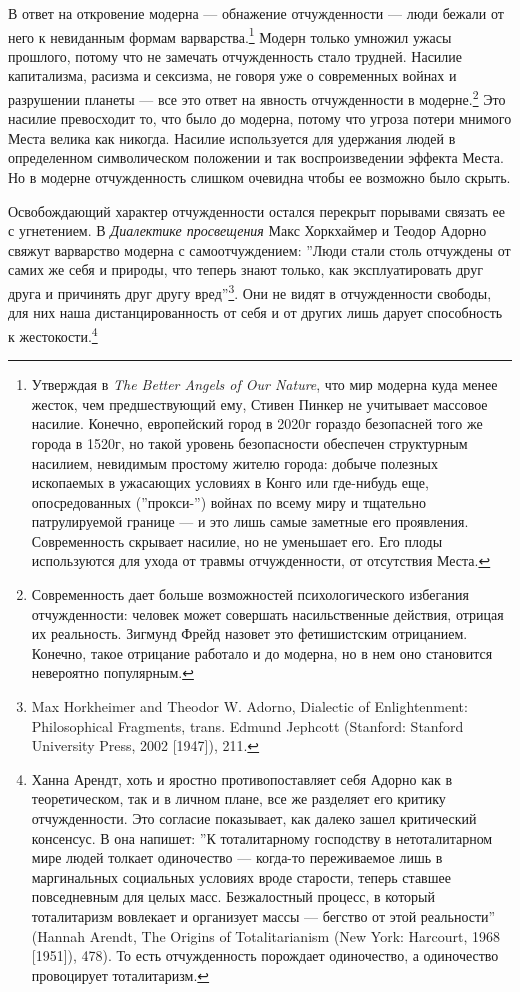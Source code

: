 \documentclass[12pt]{book}
\begin{document}
В ответ на откровение модерна --- обнажение отчужденности --- люди бежали от него к невиданным формам варварства.\footnote{Утверждая в \textit{The Better Angels of Our Nature}, что мир модерна куда менее жесток, чем предшествующий ему, Стивен Пинкер не учитывает массовое насилие. Конечно, европейский город в 2020г гораздо безопасней того же города в 1520г, но такой уровень безопасности обеспечен структурным насилием, невидимым простому жителю города: добыче полезных ископаемых в ужасающих условиях в Конго или где-нибудь еще, опосредованных (''прокси-'') войнах по всему миру и тщательно патрулируемой границе --- и это лишь самые заметные его проявления. Современность скрывает насилие, но не уменьшает его. Его плоды используются для ухода от травмы отчужденности, от отсутствия Места.} Модерн только умножил ужасы прошлого, потому что не замечать отчужденность стало трудней. Насилие капитализма, расизма и сексизма, не говоря уже о современных войнах и разрушении планеты --- все это ответ на явность отчужденности в модерне.\footnote{Современность дает больше возможностей психологического избегания отчужденности: человек может совершать насильственные действия, отрицая их реальность. Зигмунд Фрейд назовет это фетишистским отрицанием. Конечно, такое отрицание работало и до модерна, но в нем оно становится невероятно популярным.} Это насилие превосходит то, что было до модерна, потому что угроза потери мнимого Места велика как никогда. Насилие используется для удержания людей в определенном символическом положении и так воспроизведении эффекта Места. Но в модерне отчужденность слишком очевидна чтобы ее возможно было скрыть.

Освобождающий характер отчужденности остался перекрыт порывами связать ее с угнетением. В \textit{Диалектике просвещения} Макс Хоркхаймер и Теодор Адорно свяжут варварство модерна с самоотчуждением: ''Люди стали столь отчуждены от самих же себя и природы, что теперь знают только, как эксплуатировать друг друга и причинять друг другу вред''\footnote{Max Horkheimer and Theodor W. Adorno, Dialectic of Enlightenment: Philosophical Fragments, trans. Edmund Jephcott (Stanford: Stanford University Press, 2002 [1947]), 211.}. Они не видят в отчужденности свободы, для них наша дистанцированность от себя и от других лишь дарует способность к жестокости.\footnote{Ханна Арендт, хоть и яростно противопоставляет себя Адорно как в теоретическом, так и в личном плане, все же разделяет его критику отчужденности. Это согласие показывает, как далеко зашел критический консенсус. В  она напишет: ''К тоталитарному господству в нетоталитарном мире людей толкает одиночество --- когда-то переживаемое лишь в маргинальных социальных условиях вроде старости, теперь ставшее повседневным для целых масс. Безжалостный процесс, в который тоталитаризм вовлекает и организует массы --- бегство от этой реальности'' (Hannah Arendt, The Origins of Totalitarianism (New York: Harcourt, 1968 [1951]), 478). То есть отчужденность порождает одиночество, а одиночество провоцирует тоталитаризм.}
\end{document}
